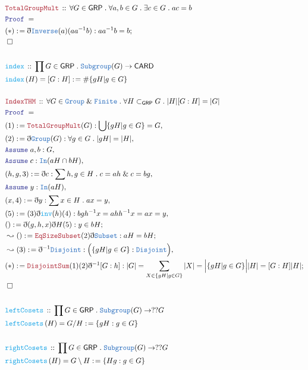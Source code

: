 \documentclass[12pt]{scrartcl}
\newcommand{\TYPE}[1]{\textcolor{NavyBlue}{\mathtt{#1}}}
\newcommand{\FUNC}[1]{\textcolor{Cerulean}{\mathtt{#1}}}
\newcommand{\LOGIC}[1]{\textcolor{Blue}{\mathtt{#1}}}
\newcommand{\THM}[1]{\textcolor{Maroon}{\mathtt{#1}}}
\renewcommand{\.}{\; . \;}
\newcommand{\de}{: \kern 0.1pc =}
\newcommand{\Act}[1]{\left( #1 \right)}
\newcommand{\Theorem}[2]{& \THM{#1} \, :: \, #2 \\ & \Proof = \\ }
\newcommand{\DeclareFunc}[2]{& \FUNC{#1} \, :: \, #2 \\}
\newcommand{\DefineNamedFunc}[4]{&  \FUNC{#1}\Act{#2} = #3 \de #4 \\}
\newcommand{\Page}[1]{ \begin{align*} #1 \end{align*}   }
\newcommand{ \bd }{ \ByDef }
\renewcommand{\And}{\; \& \;}
\newcommand{\Say}[3]{& #1 \de #2 : #3, \\}
\newcommand{\Conclude}[3]{& #1 \de #2 : #3; \\}
\newcommand{\Derive}[3]{& \leadsto #1 \de #2 : #3, \\}
\newcommand{\DeriveConclude}[3]{& \leadsto #1 \de #2 : #3 ; \\}
\newcommand{\Assume}[2]{& \LOGIC{Assume} \; #1 : #2, \\}
\newcommand{\QED}{\; \square}
\newcommand{\EndProof}{& \QED \\}
\newcommand{\ByDef}{\eth}
\newcommand{\Proof}{\LOGIC{Proof} \; }
\newcommand{\Group}{\TYPE{Group}}
\newcommand{\Sgrp}{\subset_{\mathsf{GRP}}}
\newcommand{\GRP}{\mathsf{GRP}}
\begin{document}
\Page{
	\Theorem{TotalGroupMult}{\forall G \in \GRP \.  \forall a,b \in G \. \exists c \in G \. ac = b}
	\Conclude{(*)}{ \bd \TYPE{Inverse}(a)(aa^{-1}b)}{ a a^{-1}b = b}
	\EndProof
	\\
	\DeclareFunc{index}{ \prod G \in \GRP \. \TYPE{Subgroup}(G) \to \mathsf{CARD} }
	\DefineNamedFunc{index}{H}{[G : H]}{ \# \{ gH  | g \in G \} }
	\\
	\Theorem{IndexTHM}{\forall G  \in \Group  \And \TYPE{Finite} \. 
		\forall H \Sgrp G \. |H|[G:H] = |G|
	}
	\Say{(1)}{\THM{TotalGroupMult}(G)}{ \bigcup \{ gH | g \in G \} = G }
	\Say{(2)}{\bd \Group(G)}{\forall g \in G \. |gH| = |H|}
	\Assume{a,b}{G}
	\Assume{c}{\TYPE{In}(aH \cap bH)}
	\Say{(h,g,3)}{\bd c}{\sum h,g \in H \. c = ah \And c = bg}
	\Assume{y}{\TYPE{In}(aH)}
	\Say{(x,4)}{\bd y}{\sum x \in H \. ax = y}
	\Say{(5)}{ (3)\bd \FUNC{inv}(h)(4)}{bgh^{-1}x = ahh^{-1}x = ax = y}
	\Conclude{() }{\bd (g,h,x)\bd H (5)}{ y \in bH}
	\DeriveConclude{()}{\THM{EqSizeSubset}(2)\bd\TYPE{Subset}}{aH = bH}
	\Derive{(3)}{\bd^{-1}\TYPE{Disjoint}}{ \Big( \{gH| g \in G \} : \TYPE{Disjoint}    \Big)  }
	\Conclude{(*)}{\THM{DisjointSum}(1)(2)\bd^{-1}[G:h]}
	{ |G| = \sum_{X \in \{gH | g \in G\}} |X| = \Big| \{ gH | g \in G \}\Big| |H| = [G : H]|H|  }
	\EndProof
	\\
	\DeclareFunc{leftCosets}{\prod G \in \GRP \. \TYPE{Subgroup}(G) \to ??G}
	\DefineNamedFunc{leftCosets}{H}{G/H}{\{gH : g \in G\}}
	\\
	\DeclareFunc{rightCosets}{\prod G \in \GRP \. \TYPE{Subgroup}(G) \to ??G}
	\DefineNamedFunc{rightCosets}{H}{G\setminus H}{\{ Hg : g \in G\}}
}
\newpage
\end{document}
